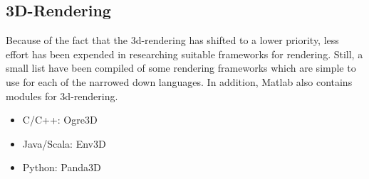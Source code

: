 \subsection{3D-Rendering}
Because of the fact that the 3d-rendering has shifted to a lower priority, less effort has been expended in researching suitable frameworks for rendering. Still, a small list have been compiled of some rendering frameworks which are simple to use for each of the narrowed down languages. In addition, Matlab also contains modules for 3d-rendering.
\begin{itemize}
	\item C/C++: Ogre3D \cite{web:ogre3d}
	\item Java/Scala: Env3D \cite{web:env3d}
	\item Python: Panda3D \cite{web:panda3d}
\end{itemize}
	